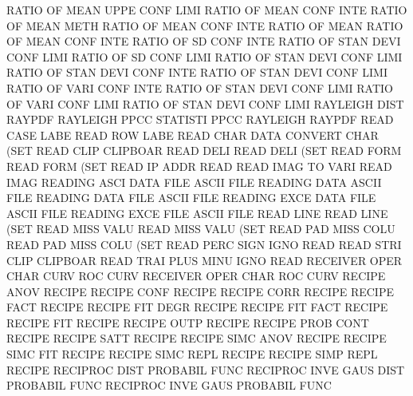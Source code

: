RATIO    OF   MEAN UPPE CONF LIMI       RATIO    OF   MEAN CONF INTE
RATIO    OF   MEAN METH                 RATIO    OF   MEAN CONF INTE
RATIO    OF   MEAN                      RATIO    OF   MEAN CONF INTE
RATIO    OF   SD   CONF INTE            RATIO    OF   STAN DEVI CONF LIMI
RATIO    OF   SD   CONF LIMI            RATIO    OF   STAN DEVI CONF LIMI
RATIO    OF   STAN DEVI CONF INTE       RATIO    OF   STAN DEVI CONF LIMI
RATIO    OF   VARI CONF INTE            RATIO    OF   STAN DEVI CONF LIMI
RATIO    OF   VARI CONF LIMI            RATIO    OF   STAN DEVI CONF LIMI
RAYLEIGH DIST                           RAYPDF
RAYLEIGH PPCC                           STATISTI PPCC
RAYLEIGH                                RAYPDF
READ     CASE LABE                      READ     ROW  LABE
READ     CHAR DATA                      CONVERT  CHAR (SET
READ     CLIP                           CLIPBOAR
READ     DELI                           READ     DELI (SET
READ     FORM                           READ     FORM (SET
READ     IP   ADDR                      READ
READ     IMAG TO   VARI                 READ     IMAG
READING  ASCI DATA FILE                 ASCII    FILE
READING  DATA                           ASCII    FILE
READING  DATA FILE                      ASCII    FILE
READING  EXCE DATA FILE                 ASCII    FILE
READING  EXCE FILE                      ASCII    FILE
READ     LINE                           READ     LINE (SET
READ     MISS VALU                      READ     MISS VALU (SET
READ     PAD  MISS COLU                 READ     PAD  MISS COLU (SET
READ     PERC SIGN IGNO                 READ
READ     STRI CLIP                      CLIPBOAR
READ     TRAI PLUS MINU IGNO            READ
RECEIVER OPER CHAR CURV                 ROC      CURV
RECEIVER OPER CHAR                      ROC      CURV
RECIPE   ANOV                           RECIPE
RECIPE   CONF                           RECIPE
RECIPE   CORR                           RECIPE
RECIPE   FACT                           RECIPE
RECIPE   FIT  DEGR                      RECIPE
RECIPE   FIT  FACT                      RECIPE
RECIPE   FIT                            RECIPE
RECIPE   OUTP                           RECIPE
RECIPE   PROB CONT                      RECIPE
RECIPE   SATT                           RECIPE
RECIPE   SIMC ANOV                      RECIPE
RECIPE   SIMC FIT                       RECIPE
RECIPE   SIMC REPL                      RECIPE
RECIPE   SIMP REPL                      RECIPE
RECIPROC DIST                           PROBABIL FUNC
RECIPROC INVE GAUS DIST                 PROBABIL FUNC
RECIPROC INVE GAUS                      PROBABIL FUNC
